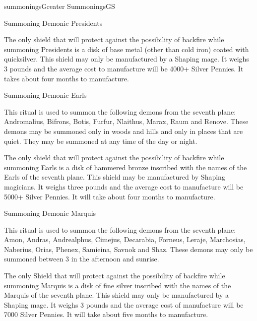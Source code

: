 \begin{College}[1.0]{summonings}{Greater Summonings}{GS}
\begin{ritual}[R-3]{Summoning Demonic Presidents}
\begin{effects}
The only shield that will protect against the possibility of backfire
while summoning Presidents is a disk of base metal (other than cold
iron) coated with quicksilver. This shield may only be manufactured by
a Shaping mage.  It weighs 3 pounds and the average cost to
manufacture will be 4000+ Silver Pennies. It takes about four months
to manufacture.
\end{effects}
\end{ritual}

\begin{ritual}[R-4]{Summoning Demonic Earls}

\begin{effects}
This ritual is used to summon the following demons from the seventh
plane: Andromalius, Bifrons, Botis, Furfur, Nlaithus, Marax, Raum and
Renove. These demons may be summoned only in woods and hills and only
in places that are quiet.  They may be summoned at any time of the day
or night.

The only shield that will protect against the possibility of
backfire while summoning Earls is a disk of hammered bronze inscribed
with the names of the Earls of the seventh plane. This shield may be
manufactured by Shaping magicians.  It weighs three pounds and the
average cost to manufacture will be 5000+ Silver Pennies.  It will
take about four months to manufacture.
\end{effects}
\end{ritual}

\begin{ritual}[R-5]{Summoning Demonic Marquis}

\begin{effects}
This ritual is used to summon the following demons from the seventh
plane: Amon, Andras, Andrealphus, Cimejus, Decarabia, Forneus,
Leraje, Marchosias, Naberius, Orias, Phenex, Samieina, Savnok and
Shaz.  These demons may only be summoned between 3 in the afternoon
and sunrise.

The only Shield that will protect against the possibility of backfire
while summoning Marquis is a disk of fine silver inscribed with the
names of the Marquis of the seventh plane. This shield may only be
manufactured by a Shaping mage.  It weighs 3 pounds and the average
cost of manufacture will be 7000 Silver Pennies. It will take about
five months to manufacture.

\end{effects}
\end{ritual}


\end{College}
